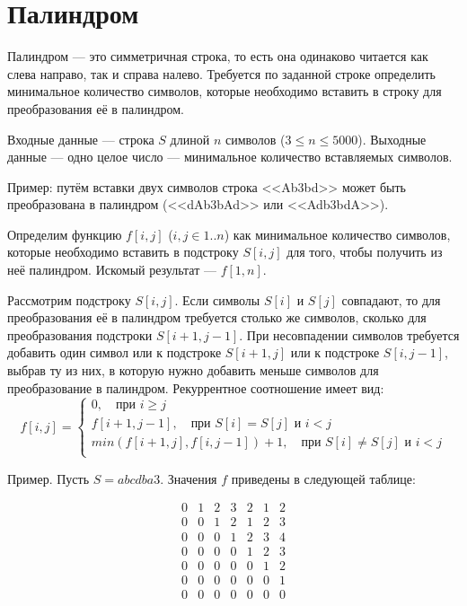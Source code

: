 \documentclass[14pt,openany]{book}
\begin{document}
\section{Палиндром}

Палиндром --- это симметричная строка, то есть она одинаково читается как слева направо,
так и справа налево. Требуется по заданной строке определить минимальное количество
символов,
которые необходимо вставить в строку для преобразования её в палиндром.

Входные данные --- строка $S$ длиной $n$ символов ($3 \le n \le 5000$).
Выходные данные --- одно целое число --- минимальное количество вставляемых символов.

Пример: путём вставки двух символов строка <<Ab3bd>> может быть преобразована
в палиндром (<<dAb3bAd>> или <<Adb3bdA>>).

Определим функцию $f[i,j]$ ($i, j \in 1..n$) как минимальное количество символов, которые
необходимо вставить в подстроку $S[i,j]$ для того, чтобы получить из неё палиндром.
Искомый результат --- $f[1,n]$.

Рассмотрим подстроку $S[i,j]$. Если символы $S[i]$ и $S[j]$ совпадают, то для преобразования её
в палиндром требуется столько же символов, сколько для преобразования подстроки $S[i+1,j-1]$.
При несовпадении символов требуется добавить один символ или к подстроке $S[i+1,j]$ или 
к подстроке $S[i,j-1]$, выбрав ту из них, в которую нужно добавить меньше символов для
преобразование в палиндром.
Рекуррентное соотношение имеет вид:
$$
  f[i,j] = \left\{\begin{array}{l}
      0, \quad \text{при $i \ge j$} \\
      f[i+1, j-1], \quad \text{при $S[i] = S[j]$ и $i < j$} \\
      min(f[i+1,j], f[i, j-1]) + 1, \quad \text{при $S[i] \neq S[j]$ и $i < j$} \\
  \end{array}\right.
$$

Пример. Пусть $S = abcdba3$. Значения $f$ приведены в следующей таблице:

$$\begin{array}{ccccccc}
0 & 1 & 2 & 3 & 2 & 1 & 2 \\
0 & 0 & 1 & 2 & 1 & 2 & 3 \\
0 & 0 & 0 & 1 & 2 & 3 & 4 \\
0 & 0 & 0 & 0 & 1 & 2 & 3 \\
0 & 0 & 0 & 0 & 0 & 1 & 2 \\
0 & 0 & 0 & 0 & 0 & 0 & 1 \\
0 & 0 & 0 & 0 & 0 & 0 & 0 \\
\end{array}$$
\end{document}
